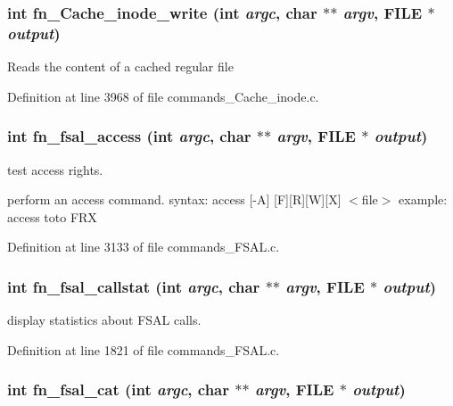 \subsubsection[{fn\_\-Cache\_\-inode\_\-write}]{\setlength{\rightskip}{0pt plus 5cm}int fn\_\-Cache\_\-inode\_\-write (int {\em argc}, \/  char $\ast$$\ast$ {\em argv}, \/  FILE $\ast$ {\em output})}\label{commands_8h_5a76c77b008b02d4ffaafe5e6c23767a}


Reads the content of a cached regular file 

Definition at line 3968 of file commands\_\-Cache\_\-inode.c.
\subsubsection[{fn\_\-fsal\_\-access}]{\setlength{\rightskip}{0pt plus 5cm}int fn\_\-fsal\_\-access (int {\em argc}, \/  char $\ast$$\ast$ {\em argv}, \/  FILE $\ast$ {\em output})}\label{commands_8h_a55a8451b4dd88ef76baea99bbef6761}


test access rights.

perform an access command. syntax: access [-A] [F][R][W][X] $<$file$>$ example: access toto FRX 

Definition at line 3133 of file commands\_\-FSAL.c.
\subsubsection[{fn\_\-fsal\_\-callstat}]{\setlength{\rightskip}{0pt plus 5cm}int fn\_\-fsal\_\-callstat (int {\em argc}, \/  char $\ast$$\ast$ {\em argv}, \/  FILE $\ast$ {\em output})}\label{commands_8h_4acd9c0eb120bb1f3dc888538b1996cb}


display statistics about FSAL calls. 

Definition at line 1821 of file commands\_\-FSAL.c.
\subsubsection[{fn\_\-fsal\_\-cat}]{\setlength{\rightskip}{0pt plus 5cm}int fn\_\-fsal\_\-cat (int {\em argc}, \/  char $\ast$$\ast$ {\em argv}, \/  FILE $\ast$ {\em output})}\label{commands_8h_fcf5d8ad163ca5a5aef0952851a37dbf}


